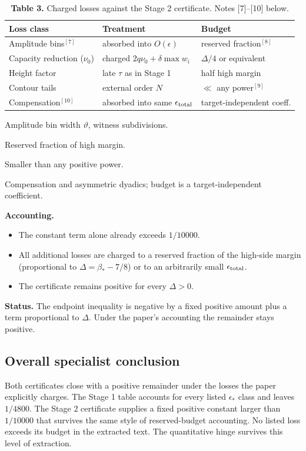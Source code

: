 \documentclass[11pt]{article}
\begin{document}
\begin{table}[H]\centering\small
\caption*{\textbf{Table 3.} Charged losses against the Stage 2 certificate. Notes [7]--[10] below.}
\begin{tabular}{@{}lll@{}}\toprule
\textbf{Loss class} & \textbf{Treatment} & \textbf{Budget}\\\midrule
Amplitude bins$^{[7]}$ & absorbed into $O(\epsilon)$ & reserved fraction$^{[8]}$\\
Capacity reduction ($\nu_0$) & charged $2q\nu_0+\delta\max w_i$ & $\Delta/4$ or equivalent\\
Height factor & late $\tau$ as in Stage 1 & half high margin\\
Contour tails & external order $N$ & $\ll$ any power$^{[9]}$\\
Compensation$^{[10]}$ & absorbed into same $\epsilon_{\rm total}$ & target-independent coeff.\\\bottomrule
\end{tabular}\end{table}
\begin{enumerate}[label={[\arabic*]},start=7,leftmargin=2.2em,itemsep=0.1em,font=\small]\small
\item Amplitude bin width $\vartheta$, witness subdivisions.
\item Reserved fraction of high margin.
\item Smaller than any positive power.
\item Compensation and asymmetric dyadics; budget is a target-independent coefficient.
\end{enumerate}

\textbf{Accounting.}
\begin{itemize}[leftmargin=1.4em,itemsep=0.2em]
\item The constant term alone already exceeds $1/10000$.
\item All additional losses are charged to a reserved fraction of the high-side margin (proportional to $\Delta=\beta_*-7/8$) or to an arbitrarily small $\epsilon_{\rm total}$.
\item The certificate remains positive for every $\Delta>0$.
\end{itemize}
\textbf{Status.} The endpoint inequality is negative by a fixed positive amount plus a term proportional to $\Delta$. Under the paper's accounting the remainder stays positive.

\subsection{Overall specialist conclusion}
Both certificates close with a positive remainder under the losses the paper explicitly charges. The Stage 1 table accounts for every listed $\epsilon_*$ class and leaves $1/4800$. The Stage 2 certificate supplies a fixed positive constant larger than $1/10000$ that survives the same style of reserved-budget accounting. No listed loss exceeds its budget in the extracted text. The quantitative hinge survives this level of extraction.
\end{document}
